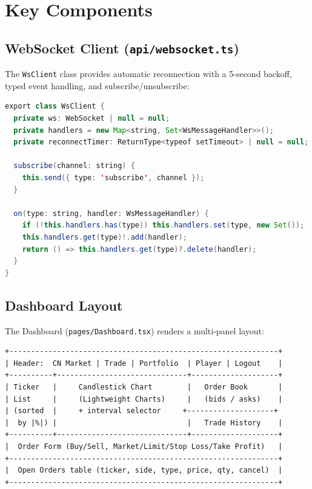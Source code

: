 \documentclass[12pt,a4paper]{report}
\begin{document}
\section{Key Components}

\subsection{WebSocket Client (\texttt{api/websocket.ts})}

The \texttt{WsClient} class provides automatic reconnection with a 5-second
backoff, typed event handling, and subscribe/unsubscribe:

\begin{lstlisting}[language=Java, caption=WebSocket client class]
export class WsClient {
  private ws: WebSocket | null = null;
  private handlers = new Map<string, Set<WsMessageHandler>>();
  private reconnectTimer: ReturnType<typeof setTimeout> | null = null;

  subscribe(channel: string) {
    this.send({ type: 'subscribe', channel });
  }

  on(type: string, handler: WsMessageHandler) {
    if (!this.handlers.has(type)) this.handlers.set(type, new Set());
    this.handlers.get(type)!.add(handler);
    return () => this.handlers.get(type)?.delete(handler);
  }
}
\end{lstlisting}

\subsection{Dashboard Layout}

The Dashboard (\texttt{pages/Dashboard.tsx}) renders a multi-panel layout:

\begin{verbatim}
+--------------------------------------------------------------+
| Header:  CN Market | Trade | Portfolio  | Player | Logout    |
+----------+------------------------------+--------------------+
| Ticker   |     Candlestick Chart        |   Order Book       |
| List     |     (Lightweight Charts)     |   (bids / asks)    |
| (sorted  |     + interval selector     +--------------------+
|  by |%|) |                              |   Trade History    |
+----------+------------------------------+--------------------+
|  Order Form (Buy/Sell, Market/Limit/Stop Loss/Take Profit)   |
+--------------------------------------------------------------+
|  Open Orders table (ticker, side, type, price, qty, cancel)  |
+--------------------------------------------------------------+
\end{verbatim}
\end{document}
